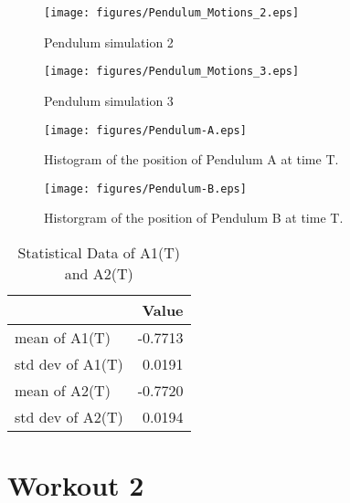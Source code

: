 \documentclass{article}
\begin{document}
\begin{figure}[H]
\centering
\texttt{[image: figures/Pendulum\_Motions\_2.eps]}
\caption{Pendulum simulation 2}
\label{fig:q1-pend-sim-2}
\end{figure}

\begin{figure}[H]
\centering
\texttt{[image: figures/Pendulum\_Motions\_3.eps]}
\caption{Pendulum simulation 3}
\label{fig:q1-pend-sim-3}
\end{figure}


\begin{figure}[H]
  \centering
  \texttt{[image: figures/Pendulum-A.eps]}
  \caption{Histogram of the position of Pendulum A at time T.}
  \label{fig:figures-Pendulum-A-eps}
\end{figure}

\begin{figure}[H]
  \centering
  \texttt{[image: figures/Pendulum-B.eps]}
  \caption{Historgram of the position of Pendulum B at time T.}
  \label{fig:figures-Pendulum-B-eps}
\end{figure}


\begin{table}[H]
\centering
\caption{Statistical Data of A1(T) and A2(T)}
\begin{tabular}{|l|r|}
\hline
\textbf{}       & \textbf{Value} \\
\hline
mean of A1(T)   & -0.7713        \\
std dev of A1(T) & 0.0191         \\
mean of A2(T)   & -0.7720        \\
std dev of A2(T) & 0.0194         \\
\hline
\end{tabular}
\end{table}


\section{Workout 2}%
\label{sec:Workout 2}
\end{document}

